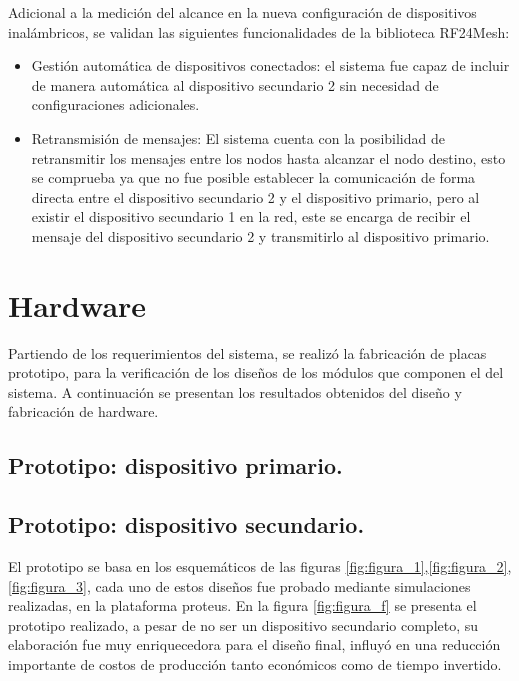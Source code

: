 Adicional a la medición del alcance en la nueva configuración de dispositivos inalámbricos, se validan las siguientes funcionalidades de la biblioteca RF24Mesh:


\begin{itemize}
\item Gestión automática de dispositivos conectados: el sistema fue capaz de incluir de manera automática al dispositivo secundario 2 sin necesidad de configuraciones adicionales.
\item Retransmisión de mensajes: El sistema cuenta con la posibilidad de retransmitir los mensajes entre los nodos hasta alcanzar el nodo destino, esto se comprueba ya que no fue posible establecer la comunicación de forma directa entre el dispositivo secundario 2 y el dispositivo primario, pero al existir el dispositivo secundario 1 en la red, este se encarga de recibir el mensaje del dispositivo secundario 2 y transmitirlo al dispositivo primario.
\end{itemize}


\section{Hardware}

Partiendo de los requerimientos del sistema, se realizó la fabricación de placas prototipo, para la verificación de los diseños de los módulos que componen el del sistema. A continuación se presentan los resultados obtenidos del diseño y fabricación de hardware.  


\subsection{Prototipo: dispositivo primario.}


\subsection{Prototipo: dispositivo secundario.}

El prototipo se basa en los esquemáticos de las figuras \ref{fig:figura_1},\ref{fig:figura_2},\ref{fig:figura_3}, cada uno de estos diseños fue probado mediante simulaciones realizadas, en la plataforma proteus. En la figura \ref{fig:figura_f} se presenta el prototipo realizado, a pesar de no ser un dispositivo secundario completo, su elaboración fue muy enriquecedora para el diseño final, influyó en una reducción importante de costos de producción tanto económicos como de tiempo invertido.  


